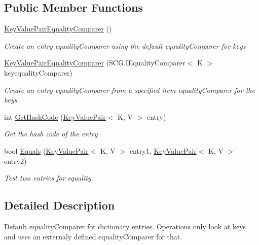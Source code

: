 \subsection*{Public Member Functions}
\begin{DoxyCompactItemize}
\item 
\hyperlink{class_c5_1_1_key_value_pair_equality_comparer_a143d9d11c9253af4f3a2232e4e3f6c3a}{Key\+Value\+Pair\+Equality\+Comparer} ()
\begin{DoxyCompactList}\small\item\em Create an entry equality\+Comparer using the default equality\+Comparer for keys \end{DoxyCompactList}\item 
\hyperlink{class_c5_1_1_key_value_pair_equality_comparer_a6a43b85adaf59be05f1ac2871889580c}{Key\+Value\+Pair\+Equality\+Comparer} (S\+C\+G.\+I\+Equality\+Comparer$<$ K $>$ keyequality\+Comparer)
\begin{DoxyCompactList}\small\item\em Create an entry equality\+Comparer from a specified item equality\+Comparer for the keys \end{DoxyCompactList}\item 
int \hyperlink{class_c5_1_1_key_value_pair_equality_comparer_a5fe3f2c92ca80bd8025478b1430d1b58}{Get\+Hash\+Code} (\hyperlink{struct_c5_1_1_key_value_pair}{Key\+Value\+Pair}$<$ K, V $>$ entry)
\begin{DoxyCompactList}\small\item\em Get the hash code of the entry \end{DoxyCompactList}\item 
bool \hyperlink{class_c5_1_1_key_value_pair_equality_comparer_a8b3336df0597e2d9bd6e0651ad3f8cc8}{Equals} (\hyperlink{struct_c5_1_1_key_value_pair}{Key\+Value\+Pair}$<$ K, V $>$ entry1, \hyperlink{struct_c5_1_1_key_value_pair}{Key\+Value\+Pair}$<$ K, V $>$ entry2)
\begin{DoxyCompactList}\small\item\em Test two entries for equality \end{DoxyCompactList}\end{DoxyCompactItemize}


\subsection{Detailed Description}
Default equality\+Comparer for dictionary entries. Operations only look at keys and uses an externaly defined equality\+Comparer for that. 



